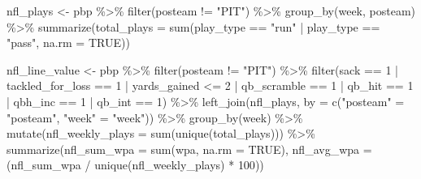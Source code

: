 \documentclass[
  letterpaper,
]{krantz}
\newenvironment{Shaded}{\begin{snugshade}}{\end{snugshade}}
\newcommand{\AttributeTok}[1]{\textcolor[rgb]{0.40,0.45,0.13}{#1}}
\newcommand{\ConstantTok}[1]{\textcolor[rgb]{0.56,0.35,0.01}{#1}}
\newcommand{\DecValTok}[1]{\textcolor[rgb]{0.68,0.00,0.00}{#1}}
\newcommand{\FunctionTok}[1]{\textcolor[rgb]{0.28,0.35,0.67}{#1}}
\newcommand{\NormalTok}[1]{\textcolor[rgb]{0.00,0.23,0.31}{#1}}
\newcommand{\OtherTok}[1]{\textcolor[rgb]{0.00,0.23,0.31}{#1}}
\newcommand{\SpecialCharTok}[1]{\textcolor[rgb]{0.37,0.37,0.37}{#1}}
\newcommand{\StringTok}[1]{\textcolor[rgb]{0.13,0.47,0.30}{#1}}
\begin{document}
\begin{Shaded}
\begin{Highlighting}[]
\NormalTok{nfl\_plays }\OtherTok{\textless{}{-}}\NormalTok{ pbp }\SpecialCharTok{\%\textgreater{}\%}
  \FunctionTok{filter}\NormalTok{(posteam }\SpecialCharTok{!=} \StringTok{"PIT"}\NormalTok{) }\SpecialCharTok{\%\textgreater{}\%}
  \FunctionTok{group\_by}\NormalTok{(week, posteam) }\SpecialCharTok{\%\textgreater{}\%}
  \FunctionTok{summarize}\NormalTok{(}\AttributeTok{total\_plays =} \FunctionTok{sum}\NormalTok{(play\_type }\SpecialCharTok{==} \StringTok{"run"} \SpecialCharTok{|}\NormalTok{ play\_type }\SpecialCharTok{==} \StringTok{"pass"}\NormalTok{,}
                              \AttributeTok{na.rm =} \ConstantTok{TRUE}\NormalTok{))}

\NormalTok{nfl\_line\_value }\OtherTok{\textless{}{-}}\NormalTok{ pbp }\SpecialCharTok{\%\textgreater{}\%}
  \FunctionTok{filter}\NormalTok{(posteam }\SpecialCharTok{!=} \StringTok{"PIT"}\NormalTok{) }\SpecialCharTok{\%\textgreater{}\%}
  \FunctionTok{filter}\NormalTok{(sack }\SpecialCharTok{==} \DecValTok{1} \SpecialCharTok{|}
\NormalTok{           tackled\_for\_loss }\SpecialCharTok{==} \DecValTok{1} \SpecialCharTok{|}
\NormalTok{           yards\_gained }\SpecialCharTok{\textless{}=} \DecValTok{2} \SpecialCharTok{|}
\NormalTok{           qb\_scramble }\SpecialCharTok{==} \DecValTok{1} \SpecialCharTok{|}
\NormalTok{           qb\_hit }\SpecialCharTok{==} \DecValTok{1} \SpecialCharTok{|}
\NormalTok{           qbh\_inc }\SpecialCharTok{==} \DecValTok{1} \SpecialCharTok{|}
\NormalTok{           qb\_int }\SpecialCharTok{==} \DecValTok{1}\NormalTok{) }\SpecialCharTok{\%\textgreater{}\%}
  \FunctionTok{left\_join}\NormalTok{(nfl\_plays,}
            \AttributeTok{by =} \FunctionTok{c}\NormalTok{(}\StringTok{"posteam"} \OtherTok{=} \StringTok{"posteam"}\NormalTok{, }\StringTok{"week"} \OtherTok{=} \StringTok{"week"}\NormalTok{)) }\SpecialCharTok{\%\textgreater{}\%}
  \FunctionTok{group\_by}\NormalTok{(week) }\SpecialCharTok{\%\textgreater{}\%}
  \FunctionTok{mutate}\NormalTok{(}\AttributeTok{nfl\_weekly\_plays =} \FunctionTok{sum}\NormalTok{(}\FunctionTok{unique}\NormalTok{(total\_plays))) }\SpecialCharTok{\%\textgreater{}\%}
  \FunctionTok{summarize}\NormalTok{(}\AttributeTok{nfl\_sum\_wpa =} \FunctionTok{sum}\NormalTok{(wpa, }\AttributeTok{na.rm =} \ConstantTok{TRUE}\NormalTok{),}
            \AttributeTok{nfl\_avg\_wpa =}\NormalTok{ (nfl\_sum\_wpa }\SpecialCharTok{/} \FunctionTok{unique}\NormalTok{(nfl\_weekly\_plays) }\SpecialCharTok{*} \DecValTok{100}\NormalTok{))}
\end{Highlighting}
\end{Shaded}
\end{document}
